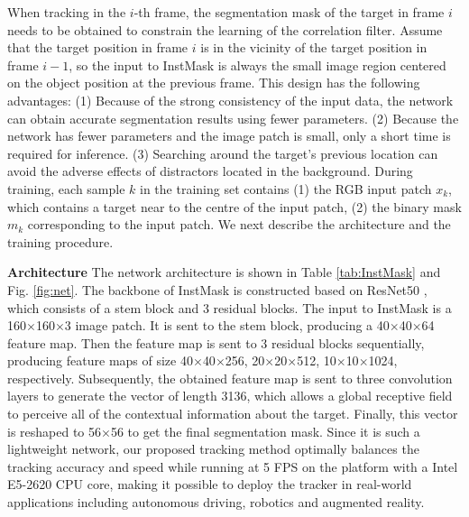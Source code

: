 \documentclass[review]{elsarticle}
\begin{document}
\begin{CJK*}{UTF8}{gbsn}
When tracking in the $i$-th frame, the segmentation mask of the target in frame $i$ needs to be obtained to constrain the learning of the correlation filter. 
Assume that the target position in frame $i$ is in the vicinity of the target position in frame $i-1$, so the input to InstMask is always the small image region centered on the object position at the previous frame.
This design has the following advantages: (1) Because of the strong consistency of the input data, the network can obtain accurate segmentation results using fewer parameters. (2) Because the network has fewer parameters and the image patch is small, only a short time is required for inference. (3) Searching around the target's previous location can avoid the adverse effects of distractors located in the background. During training, each sample $k$ in the training set contains (1) the RGB input patch $x_k$, which contains a target near to the centre of the input patch, (2) the binary mask $m_{k}$ corresponding to the input patch.
We next describe the architecture and the training procedure.

\textbf{Architecture} The network architecture is shown in Table \ref{tab:InstMask} and Fig. \ref{fig:net}. The backbone of InstMask is constructed based on ResNet50 \cite{He2016DeepRL}, which consists of a stem block and 3 residual blocks.
The input to InstMask is a 160$\times$160$\times$3 image patch. It is sent to the stem block, producing a 40$\times$40$\times$64 feature map. Then the feature map is sent to 3 residual blocks sequentially, producing feature maps of size 40$\times$40$\times$256, 20$\times$20$\times$512, 10$\times$10$\times$1024, respectively. Subsequently, the obtained feature map is sent to three convolution layers to generate the vector of length 3136, which allows a global receptive field to perceive all of the contextual information about the target. Finally, this vector is reshaped to 56$\times$56 to get the final segmentation mask. Since it is such a lightweight network, our proposed tracking method optimally balances the tracking accuracy and speed while running at 5 FPS on the platform with a Intel E5-2620 CPU core, making it possible to deploy the tracker in real-world applications including autonomous driving, robotics and augmented reality.


\end{CJK*}
\end{document}
